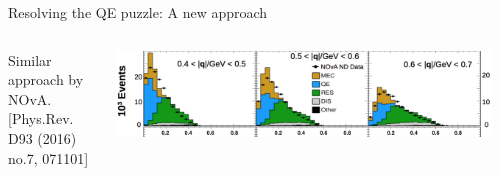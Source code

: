 \begin{frame}{Resolving the QE puzzle: A new approach}
  \begin{columns}
    \begin{column}{0.30\textwidth}
      {\scriptsize
        Similar approach by NOvA.\\
        {\tiny [Phys.Rev. D93 (2016) no.7, 071101]}\\
        }
    \end{column}
    \begin{column}{0.70\textwidth}
     \begin{center}
        \includegraphics[width=0.95\textwidth]{./images/nuint/ccqe/nova_q0q3_few_bins.png}\\
     \end{center}
    \end{column}
  \end{columns}

\end{frame}


